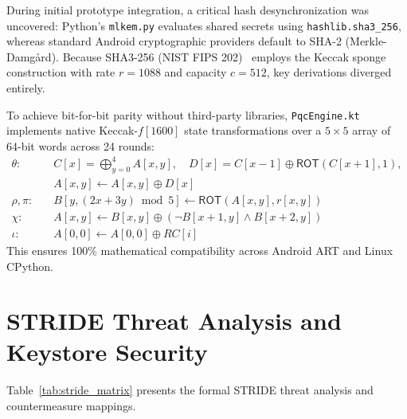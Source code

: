 During initial prototype integration, a critical hash desynchronization was uncovered: Python's \texttt{mlkem.py} evaluates shared secrets using \texttt{hashlib.sha3\_256}, whereas standard Android cryptographic providers default to SHA-2 (Merkle-Damg{\aa}rd). Because SHA3-256 (NIST FIPS 202)~\cite{nist_sp_800_227} employs the Keccak sponge construction with rate $r = 1088$ and capacity $c = 512$, key derivations diverged entirely.

To achieve bit-for-bit parity without third-party libraries, \texttt{PqcEngine.kt} implements native Keccak-$f[1600]$ state transformations over a $5 \times 5$ array of 64-bit words across 24 rounds:
\begin{align}
\theta: \quad & C[x] = \bigoplus_{y=0}^4 A[x, y], \quad D[x] = C[x-1] \oplus \mathsf{ROT}(C[x+1], 1), \\
              & A[x, y] \leftarrow A[x, y] \oplus D[x] \\
\rho, \pi: \quad & B[y, (2x + 3y) \bmod 5] \leftarrow \mathsf{ROT}(A[x, y], r[x, y]) \\
\chi: \quad & A[x, y] \leftarrow B[x, y] \oplus (\neg B[x+1, y] \wedge B[x+2, y]) \\
\iota: \quad & A[0, 0] \leftarrow A[0, 0] \oplus RC[i]
\end{align}
This ensures 100\% mathematical compatibility across Android ART and Linux CPython.

\section{STRIDE Threat Analysis and Keystore Security}
\label{sec:stride_analysis}

Table~\ref{tab:stride_matrix} presents the formal STRIDE threat analysis and countermeasure mappings.

